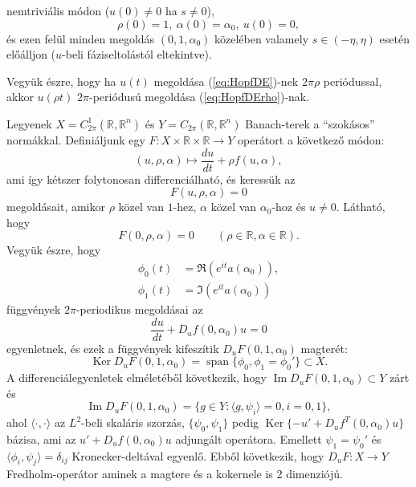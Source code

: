 \documentclass[oneside, titlepage, 12pt, a4paper]{report}
\DeclareMathOperator{\Ima}{Im}	%
\DeclareMathOperator{\Ker}{Ker}	%
\DeclareMathOperator{\Span}{span}	%
\begin{document}
nemtriviális módon ($u(0) \ne 0$ ha $s \ne 0$),
\begin{equation*}
\rho(0) = 1, \> \alpha(0) = \alpha_0, \> u(0) = 0,
\end{equation*}
és ezen felül minden megoldás $(0, 1, \alpha_0)$ közelében valamely $s \in (-\eta, \eta)$ esetén előálljon ($u$-beli fáziseltolástól eltekintve). \par
Vegyük észre, hogy ha $u(t)$ megoldása (\ref{eq:HopfDE})-nek $2 \pi \rho$ periódussal, akkor $u(\rho t)$ $2\pi$-periódusú megoldása (\ref{eq:HopfDErho})-nak.\par
Legyenek $X = C^1_{2\pi}(\mathbb{R}, \mathbb{R}^n)$ és $Y = C_{2\pi}(\mathbb{R}, \mathbb{R}^n)$ Banach-terek a ``szokásos'' normákkal. Definiáljunk egy $F : X \times \mathbb{R} \times \mathbb{R} \rightarrow Y$ operátort a következő módon:
\begin{equation*}
(u, \rho, \alpha) \mapsto \frac{du}{dt} + \rho f(u, \alpha),
\end{equation*}
ami így kétszer folytonosan differenciálható, és keressük az
\begin{equation}
\label{eq:HopfDEbigF}
F(u, \rho, \alpha) = 0
\end{equation}
megoldásait, amikor $\rho$ közel van $1$-hez, $\alpha$ közel van $\alpha_0$-hoz és $u \ne 0$. Látható, hogy
\begin{equation*}
F(0, \rho, \alpha) = 0 \qquad (\rho \in \mathbb{R}, \alpha \in \mathbb{R}).
\end{equation*}
Vegyük észre, hogy
\begin{align*}
\phi_0(t) &= \Re(e^{it}a(\alpha_0)), \\
\phi_1(t) &= \Im(e^{it}a(\alpha_0))
\end{align*}
függvények $2\pi$-periodikus megoldásai az
\begin{equation}
\frac{du}{dt} + D_uf(0, \alpha_0)u = 0
\end{equation}
egyenletnek, és ezek a függvények kifeszítik $D_uF(0, 1, \alpha_0)$ magterét:
\begin{equation*}
\Ker D_uF(0, 1, \alpha_0) = \Span \{ \phi_0, \phi_1 = \phi_0'\} \subset X.
\end{equation*}
A differenciálegyenletek elméletéből következik, hogy $\Ima D_uF(0, 1, \alpha_0) \subset Y$ zárt és
\begin{equation*}
\Ima D_uF(0, 1, \alpha_0) = \{ g \in Y : \langle g, \psi_i \rangle = 0, i = 0, 1\},
\end{equation*}
ahol $\langle \cdot , \cdot \rangle$ az $L^2$-beli skaláris szorzás, $\{\psi_0, \psi_1 \}$ pedig $\Ker \{ -u' + D_uf^T(0, \alpha_0)u\}$ bázisa, ami az $u' + D_uf(0, \alpha_0)u$ adjungált operátora. Emellett $\psi_1 = \psi_0'$ és $\langle \phi_i, \psi_j \rangle = \delta_{ij}$ Kronecker-deltával egyenlő. Ebből következik, hogy $D_uF : X \rightarrow Y$ Fredholm-operátor aminek a magtere és a kokernele is 2 dimenziójú. \par
\end{document}
